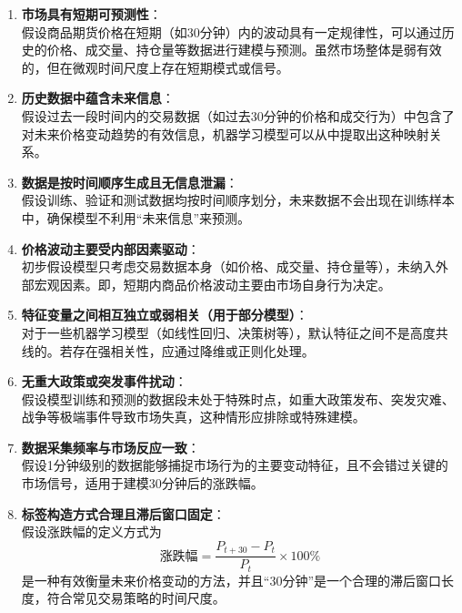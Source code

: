 \documentclass[a4paper,11pt]{ctexart}
\begin{document}
\begin{enumerate}
    \item \textbf{市场具有短期可预测性}：\\
    假设商品期货价格在短期（如30分钟）内的波动具有一定规律性，可以通过历史的价格、成交量、持仓量等数据进行建模与预测。虽然市场整体是弱有效的，但在微观时间尺度上存在短期模式或信号。

    \item \textbf{历史数据中蕴含未来信息}：\\
    假设过去一段时间内的交易数据（如过去30分钟的价格和成交行为）中包含了对未来价格变动趋势的有效信息，机器学习模型可以从中提取出这种映射关系。

    \item \textbf{数据是按时间顺序生成且无信息泄漏}：\\
    假设训练、验证和测试数据均按时间顺序划分，未来数据不会出现在训练样本中，确保模型不利用“未来信息”来预测。

    \item \textbf{价格波动主要受内部因素驱动}：\\
    初步假设模型只考虑交易数据本身（如价格、成交量、持仓量等），未纳入外部宏观因素。即，短期内商品价格波动主要由市场自身行为决定。

    \item \textbf{特征变量之间相互独立或弱相关（用于部分模型）}：\\
    对于一些机器学习模型（如线性回归、决策树等），默认特征之间不是高度共线的。若存在强相关性，应通过降维或正则化处理。

    \item \textbf{无重大政策或突发事件扰动}：\\
    假设模型训练和预测的数据段未处于特殊时点，如重大政策发布、突发灾难、战争等极端事件导致市场失真，这种情形应排除或特殊建模。

    \item \textbf{数据采集频率与市场反应一致}：\\
    假设1分钟级别的数据能够捕捉市场行为的主要变动特征，且不会错过关键的市场信号，适用于建模30分钟后的涨跌幅。

    \item \textbf{标签构造方式合理且滞后窗口固定}：\\
    假设涨跌幅的定义方式为
    \[
    \text{涨跌幅} = \frac{P_{t+30} - P_t}{P_t} \times 100\%
    \]
    是一种有效衡量未来价格变动的方法，并且“30分钟”是一个合理的滞后窗口长度，符合常见交易策略的时间尺度。
\end{enumerate}
\end{document}
